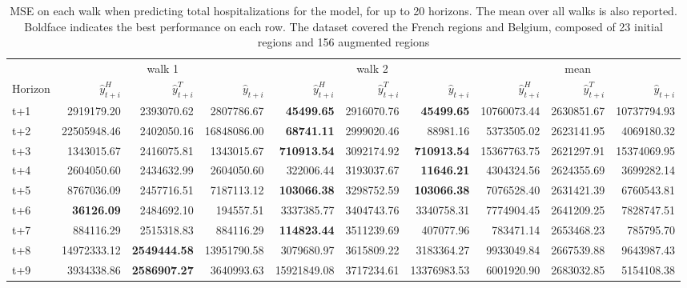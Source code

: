 \begin{table}[H]
\centering
\caption{MSE on each walk when predicting total hospitalizations for the model, for up to 20 horizons. The mean over all walks is also reported. Boldface indicates the best performance on each row. The dataset covered the French regions and Belgium, composed of 23 initial regions and 156 augmented regions }
\label{tab:MSE_walk_assemble}
\begin{tabular}{lrrrrrrrrr}
\toprule
 & \multicolumn{3}{c}{walk 1} & \multicolumn{3}{c}{walk 2} & \multicolumn{3}{c}{mean} 
\\

\cmidrule(lr){2-4} \cmidrule(lr){5-7} \cmidrule(lr){8-10} 
Horizon & $\hat{y}_{t+i}^H$ & $\hat{y}_{t+i}^T$ & $\hat{y}_{t+i}$ & $\hat{y}_{t+i}^H$ & $\hat{y}_{t+i}^T$ & $\hat{y}_{t+i}$ & $\hat{y}_{t+i}^H$ & $\hat{y}_{t+i}^T$ & $\hat{y}_{t+i}$ \\
\midrule
t+1  & 2919179.20  & 2393070.62  & 2807786.67  & \textbf{45499.65}  & 2916070.76  & \textbf{45499.65}  & 10760073.44  & 2630851.67  & 10737794.93  \\
t+2  & 22505948.46  & 2402050.16  & 16848086.00  & \textbf{68741.11}  & 2999020.46  & 88981.16  & 5373505.02  & 2623141.95  & 4069180.32  \\
t+3  & 1343015.67  & 2416075.81  & 1343015.67  & \textbf{710913.54}  & 3092174.92  & \textbf{710913.54}  & 15367763.75  & 2621297.91  & 15374069.95  \\
t+4  & 2604050.60  & 2434632.99  & 2604050.60  & 322006.44  & 3193037.67  & \textbf{11646.21}  & 4304324.56  & 2624355.69  & 3699282.14  \\
t+5  & 8767036.09  & 2457716.51  & 7187113.12  & \textbf{103066.38}  & 3298752.59  & \textbf{103066.38}  & 7076528.40  & 2631421.39  & 6760543.81  \\
t+6  & \textbf{36126.09}  & 2484692.10  & 194557.51  & 3337385.77  & 3404743.76  & 3340758.31  & 7774904.45  & 2641209.25  & 7828747.51  \\
t+7  & 884116.29  & 2515318.83  & 884116.29  & \textbf{114823.44}  & 3511239.69  & 407077.96  & 783471.14  & 2653468.23  & 785795.70  \\
t+8  & 14972333.12  & \textbf{2549444.58}  & 13951790.58  & 3079680.97  & 3615809.22  & 3183364.27  & 9933049.84  & 2667539.88  & 9643987.43  \\
t+9  & 3934338.86  & \textbf{2586907.27}  & 3640993.63  & 15921849.08  & 3717234.61  & 13376983.53  & 6001920.90  & 2683032.85  & 5154108.38  \\

\end{tabular}
\end{table}
